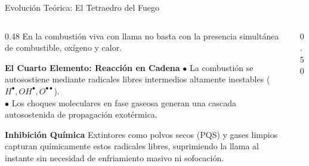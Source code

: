 \begin{frame}{Evolución Teórica: El Tetraedro del Fuego}
  \begin{columns}[c]
    \begin{column}{0.48\textwidth}
      \small
      En la combustión viva con llama no basta con la presencia simultánea de combustible, oxígeno y calor.
      \begin{block}{\textbf{El Cuarto Elemento: Reacción en Cadena}}
        \scriptsize
        $\bullet$ La combustión se autosostiene mediante radicales libres intermedios altamente inestables ($H^\bullet, OH^\bullet, O^{\bullet\bullet}$).\\
        $\bullet$ Los choques moleculares en fase gaseosa generan una cascada autosostenida de propagación exotérmica.
      \end{block}
      \vspace{0.15cm}
      \begin{alertblock}{\textbf{Inhibición Química}}
        \scriptsize
        Extintores como polvos secos (PQS) y gases limpios capturan químicamente estos radicales libres, suprimiendo la llama al instante sin necesidad de enfriamiento masivo ni sofocación.
      \end{alertblock}
    \end{column}

    \begin{column}{0.50\textwidth}
      \centering
\end{column}
\end{columns}
\end{frame}
